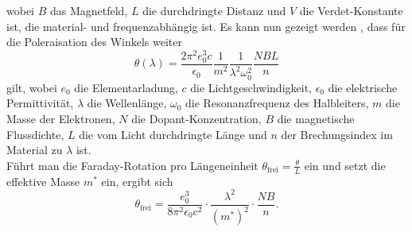 wobei $B$ das Magnetfeld, $L$ die durchdringte Distanz und $V$ die Verdet-Konstante ist, die material- und frequenzabhängig ist. \cite{heintze}
Es kann nun gezeigt werden \cite{anhang}, dass für die Poleraisation des Winkels weiter
\begin{equation*}
    \theta(\lambda) = \frac{2 \pi^2 e_0^3 c}{\epsilon_0} \frac{1}{m^2} \frac{1}{\lambda^2 \omega_0^2} \frac{NBL}{n}
    \label{eq:theta_ohne_effektivemasse}
\end{equation*}
gilt, wobei $e_0$ die Elementarladung, $c$ die Lichtgeschwindigkeit, $\epsilon_0$ die elektrische Permittivität, $\lambda$ die Wellenlänge, $\omega_0$ die Resonanzfrequenz des Halbleiters, $m$ die Masse der Elektronen, $N$ die Dopant-Konzentration, $B$ die magnetische
Flussdichte, $L$ die vom Licht durchdringte Länge und $n$ der Brechungsindex im Material zu $\lambda$ ist.\\
Führt man die Faraday-Rotation pro Längeneinheit $\theta_\text{frei} = \frac{\theta}{L}$ ein und setzt die effektive Masse $m^{*}$ ein, ergibt sich
\begin{equation}
    \theta_\text{frei} = \frac{e_0^3}{8 \pi^2 \epsilon_0 c^2} \cdot \frac{\lambda^2}{(m^{*})^2} \cdot \frac{NB}{n}. 
    \label{eq:theta_frei}
\end{equation}
\cite{anhang}